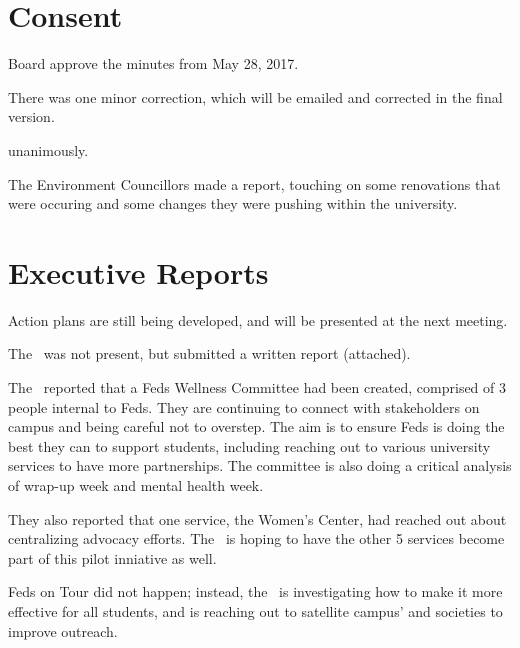 \section*{Consent}

\begin{motion}
    \birt Board approve the minutes from May 28, 2017.
    \movers{\tristan}{\seneca}

    There was one minor correction, which will be emailed and corrected in
    the final version.

    \carries unanimously.
\end{motion}

\begin{information}
    The Environment Councillors made a report, touching on some renovations
    that were occuring and some changes they were pushing within the 
    university.
\end{information}

\section*{Executive Reports}

Action plans are still being developed, and will be presented at the 
next meeting. 


The \pres\ was not present, but submitted a written report (attached). 


\begin{information}
    
    The \vpi\ reported that a Feds Wellness Committee had been created, 
    comprised of 3 people internal to Feds. They are continuing to connect with
    stakeholders on campus and being careful not to overstep. The aim is to 
    ensure Feds is doing the best they can to support students, including 
    reaching out to various university services to have more partnerships. 
    The committee is also doing a critical analysis of wrap-up week and 
    mental health week. 

    They also reported that one service, the Women's Center, had reached out 
    about centralizing advocacy efforts. The \vpi\ is hoping to have the other 
    5 services become part of this pilot inniative as well. 

    Feds on Tour did not happen; instead, the \vpi\ is investigating how 
    to make it more effective for all students, and is reaching out to 
    satellite campus' and societies to improve outreach. 

\end{information}

